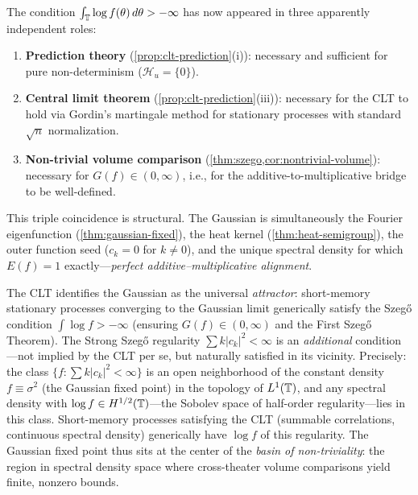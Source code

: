 \begin{remark}
The condition $\int_{\mathbb{T}} \log f(\theta)\, d\theta > -\infty$ has now appeared in three apparently independent roles:
\begin{enumerate}
\item \textbf{Prediction theory} (\cref{prop:clt-prediction}(i)): necessary and sufficient for pure non-determinism ($\mathcal{H}_u = \{0\}$).
\item \textbf{Central limit theorem} (\cref{prop:clt-prediction}(iii)): necessary for the CLT to hold via Gordin's martingale method for stationary processes with standard $\sqrt{n}$ normalization.
\item \textbf{Non-trivial volume comparison} (\cref{thm:szego,cor:nontrivial-volume}): necessary for $G(f) \in (0, \infty)$, i.e., for the additive-to-multiplicative bridge to be well-defined.
\end{enumerate}
This triple coincidence is structural. The Gaussian is simultaneously the Fourier eigenfunction (\cref{thm:gaussian-fixed}), the heat kernel (\cref{thm:heat-semigroup}), the outer function seed ($c_k = 0$ for $k \neq 0$), and the unique spectral density for which $E(f) = 1$ exactly---\emph{perfect additive--multiplicative alignment}.

The CLT identifies the Gaussian as the universal \emph{attractor}: short-memory stationary processes converging to the Gaussian limit generically satisfy the Szeg\H{o} condition $\int \log f > -\infty$ (ensuring $G(f) \in (0,\infty)$ and the First Szeg\H{o} Theorem). The Strong Szeg\H{o} regularity $\sum k|c_k|^2 < \infty$ is an \emph{additional} condition---not implied by the CLT per se, but naturally satisfied in its vicinity. Precisely: the class $\{f : \sum k|c_k|^2 < \infty\}$ is an open neighborhood of the constant density $f \equiv \sigma^2$ (the Gaussian fixed point) in the topology of $L^1(\mathbb{T})$, and any spectral density with $\log f \in H^{1/2}(\mathbb{T})$---the Sobolev space of half-order regularity---lies in this class. Short-memory processes satisfying the CLT (summable correlations, continuous spectral density) generically have $\log f$ of this regularity. The Gaussian fixed point thus sits at the center of the \emph{basin of non-triviality}: the region in spectral density space where cross-theater volume comparisons yield finite, nonzero bounds.
\end{remark}

